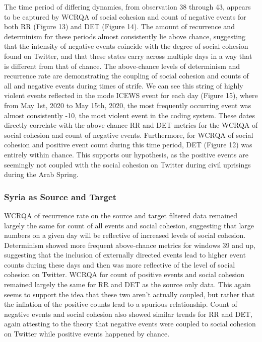 \documentclass[english,man]{apa6}
\begin{document}
The time period of differing dynamics, from observation 38 through 43, appears to be captured by WCRQA of social cohesion and count of negative events for both RR (Figure 13) and DET (Figure 14). The amount of recurrence and determinism for these periods almost consistently lie above chance, suggesting that the intensity of negative events coincide with the degree of social cohesion found on Twitter, and that these states carry across multiple days in a way that is different from that of chance.
The above-chance levels of determinism and recurrence rate are demonstrating the coupling of social cohesion and counts of all and negative events during times of strife. We can see this string of highly violent events reflected in the mode ICEWS event for each day (Figure 15), where from May 1st, 2020 to May 15th, 2020, the most frequently occurring event was almost consistently -10, the most violent event in the coding system. These dates directly correlate with the above chance RR and DET metrics for the WCRQA of social cohesion and count of negative events. Furthermore, for WCRQA of social cohesion and positive event count during this time period, DET (Figure 12) was entirely within chance. This supports our hypothesis, as the positive events are seemingly not coupled with the social cohesion on Twitter during civil uprisings during the Arab Spring.

\hypertarget{syria-as-source-and-target-3}{%
\subsubsection{Syria as Source and Target}\label{syria-as-source-and-target-3}}

WCRQA of recurrence rate on the source and target filtered data remained largely the same for count of all events and social cohesion, suggesting that large numbers on a given day will be reflective of increased levels of social cohesion. Determinism showed more frequent above-chance metrics for windows 39 and up, suggesting that the inclusion of externally directed events lead to higher event counts during these days and then was more reflective of the level of social cohesion on Twitter. WCRQA for count of positive events and social cohesion remained largely the same for RR and DET as the source only data. This again seems to support the idea that these two aren't actually coupled, but rather that the inflation of the positive counts lead to a spurious relationship. Count of negative events and social cohesion also showed similar trends for RR and DET, again attesting to the theory that negative events were coupled to social cohesion on Twitter while positive events happened by chance.
\end{document}

